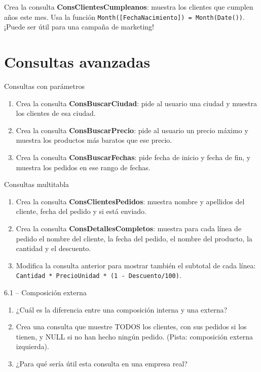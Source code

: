 \documentclass[12pt,a4paper]{article}
\begin{document}
\begin{reto}
Crea la consulta \textbf{ConsClientesCumpleanos}: muestra los clientes que cumplen años este mes. Usa la función \texttt{Month([FechaNacimiento]) = Month(Date())}. ¡Puede ser útil para una campaña de marketing!
\end{reto}

\section{Consultas avanzadas}

\begin{practica}{Consultas con parámetros}
\begin{enumerate}
  \item Crea la consulta \textbf{ConsBuscarCiudad}: pide al usuario una ciudad y muestra los clientes de esa ciudad.
  \item Crea la consulta \textbf{ConsBuscarPrecio}: pide al usuario un precio máximo y muestra los productos más baratos que ese precio.
  \item Crea la consulta \textbf{ConsBuscarFechas}: pide fecha de inicio y fecha de fin, y muestra los pedidos en ese rango de fechas.
\end{enumerate}
\end{practica}

\begin{practica}{Consultas multitabla}
\begin{enumerate}
  \item Crea la consulta \textbf{ConsClientesPedidos}: muestra nombre y apellidos del cliente, fecha del pedido y si está enviado.
  \item Crea la consulta \textbf{ConsDetallesCompletos}: muestra para cada línea de pedido el nombre del cliente, la fecha del pedido, el nombre del producto, la cantidad y el descuento.
  \item Modifica la consulta anterior para mostrar también el subtotal de cada línea: \texttt{Cantidad * PrecioUnidad * (1 - Descuento/100)}.
\end{enumerate}
\end{practica}

\begin{ejercicio}{6.1 -- Composición externa}
\begin{enumerate}[label=\alph*)]
  \item ¿Cuál es la diferencia entre una composición interna y una externa?
  \item Crea una consulta que muestre TODOS los clientes, con sus pedidos si los tienen, y NULL si no han hecho ningún pedido. (Pista: composición externa izquierda).
  \item ¿Para qué sería útil esta consulta en una empresa real?
\end{enumerate}
\end{ejercicio}
\end{document}
